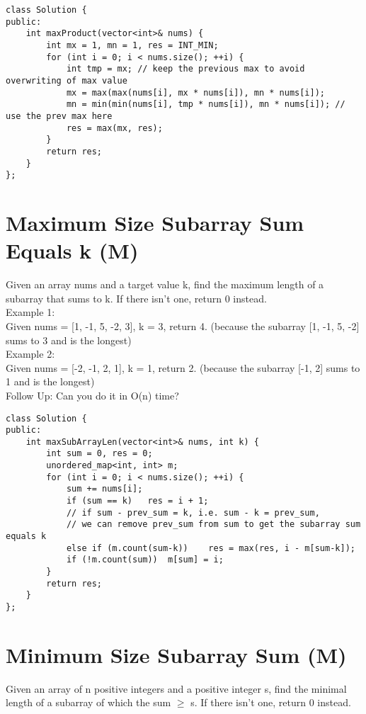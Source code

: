 \begin{lstlisting}
class Solution {
public:
    int maxProduct(vector<int>& nums) {
        int mx = 1, mn = 1, res = INT_MIN;
        for (int i = 0; i < nums.size(); ++i) {
            int tmp = mx; // keep the previous max to avoid overwriting of max value
            mx = max(max(nums[i], mx * nums[i]), mn * nums[i]);
            mn = min(min(nums[i], tmp * nums[i]), mn * nums[i]); // use the prev max here
            res = max(mx, res);
        }
        return res;
    }
};
\end{lstlisting}

\section{Maximum Size Subarray Sum Equals k (M)}
Given an array nums and a target value k, find the maximum length of a subarray that sums to k. If there isn't one, return 0 instead.\\

Example 1:\\
Given nums = [1, -1, 5, -2, 3], k = 3, return 4. (because the subarray [1, -1, 5, -2] sums to 3 and is the longest)\\

Example 2: \\
Given nums = [-2, -1, 2, 1], k = 1, return 2. (because the subarray [-1, 2] sums to 1 and is the longest) \\

Follow Up:
Can you do it in O(n) time? \\

\begin{lstlisting}
class Solution {
public:
    int maxSubArrayLen(vector<int>& nums, int k) {
        int sum = 0, res = 0;
        unordered_map<int, int> m;
        for (int i = 0; i < nums.size(); ++i) {
            sum += nums[i];
            if (sum == k)   res = i + 1;
            // if sum - prev_sum = k, i.e. sum - k = prev_sum,
            // we can remove prev_sum from sum to get the subarray sum equals k
            else if (m.count(sum-k))    res = max(res, i - m[sum-k]);
            if (!m.count(sum))  m[sum] = i;
        }
        return res;
    }
};
\end{lstlisting}


\section{Minimum Size Subarray Sum (M)}
Given an array of n positive integers and a positive integer s, find the minimal length of a subarray of which the sum $\geq$ s. If there isn't one, return 0 instead.\\

